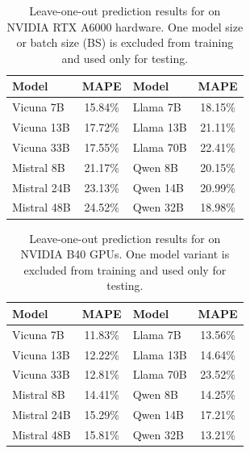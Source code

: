 \begin{table}[t]
\centering
\small
\renewcommand{\arraystretch}{1.05}
\begin{tabular}{lclc}
\hline
\textbf{Model} & \textbf{MAPE} & \textbf{Model} & \textbf{MAPE} \\
\hline
\rowcolor{rowblue}Vicuna 7B     & 15.84\% & Llama 7B      & 18.15\% \\
Vicuna 13B    & 17.72\% & Llama 13B     & 21.11\% \\
\rowcolor{rowblue}Vicuna 33B    & 17.55\% & Llama 70B     & 22.41\% \\
\hline
Mistral 8B    & 21.17\% & Qwen 8B       & 20.15\% \\
\rowcolor{rowblue}Mistral 24B   & 23.13\% & Qwen 14B      & 20.99\% \\
Mistral 48B   & 24.52\% & Qwen 32B      & 18.98\% \\
\hline
\end{tabular}
\caption{Leave-one-out prediction results for \sys{} on NVIDIA RTX A6000 hardware. One model size or batch size (BS) is excluded from training and used only for testing.}
\label{tab:loo_generalization}
\end{table}

\begin{table}[t]
\centering
\small
\setlength{\tabcolsep}{4pt}
\renewcommand{\arraystretch}{1.05}
\begin{tabular}{lclc}
\hline
\textbf{Model} & \textbf{MAPE} & \textbf{Model} & \textbf{MAPE} \\
\hline
\rowcolor{rowblue}Vicuna 7B  & 11.83\% & Llama 7B   & 13.56\% \\
Vicuna 13B                  & 12.22\% & Llama 13B  & 14.64\% \\
\rowcolor{rowblue}Vicuna 33B & 12.81\% & Llama 70B  & 23.52\% \\
\hline
Mistral 8B                  & 14.41\% & Qwen 8B    & 14.25\% \\
\rowcolor{rowblue}Mistral 24B & 15.29\% & Qwen 14B   & 17.21\% \\
Mistral 48B                 & 15.81\% & Qwen 32B   & 13.21\% \\
\hline
\end{tabular}
\caption{Leave-one-out prediction results for \sys{} on NVIDIA B40 GPUs. One model variant is excluded from training and used only for testing.}
\label{tab:b40_loo_generalization}
\end{table}

